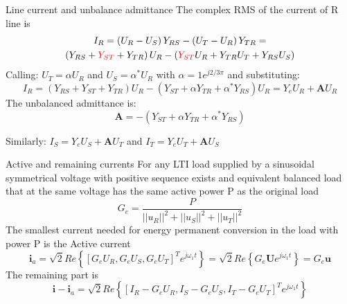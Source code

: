 \documentclass[aspectratio=169]{beamer}
\begin{document}
\begin{frame}{Line current and unbalance admittance}{\insertsection}
    The complex RMS of the current of R line is 
    \begin{gather}
        I_R = \left(U_R-U_S\right)Y_{RS} - \left(U_T-U_R\right)Y_{TR} = \notag \\
        \left(Y_{RS} + \textcolor{red}{Y_{ST}} + Y_{TR}\right) U_R - \left(\textcolor{red}{Y_{ST}}U_R + Y_{TR}U_T + Y_{RS}U_S\right)
    \end{gather}
    Calling: $U_T = \alpha U_R$ and $U_S = \alpha^* U_R$ with $\alpha=1e^{j2/3\pi}$ and substituting:
    \begin{equation}
        I_R = \left(Y_{RS} + Y_{ST} + Y_{TR}\right) U_R - \left(Y_{ST} + \alpha Y_{TR} + \alpha^* Y_{RS}\right)U_R = Y_e U_R + \textbf{A} U_R
        \label{eq:I_R}
    \end{equation}
     The \textcolor{NTNU_orange}{unbalanced admittance} is:
    \begin{equation}
      \textbf{A} =-(Y_{ST} + \alpha Y_{TR} + \alpha^*Y_{RS} )
    \end{equation}

    Similarly: $I_S = Y_e U_S + \textbf{A} U_T$  and  $I_T = Y_e U_T + \textbf{A} U_S$
\end{frame}

\begin{frame}{Active and remaining currents}{\insertsection}
    For any LTI load supplied by a sinusoidal symmetrical voltage with positive sequence exists and equivalent balanced load that at the same voltage has the same active power P as the original load
    \begin{equation}
        G_e = \frac{P}{||u_R||^2 + ||u_S||^2 + ||u_T||^2} 
    \end{equation}
    The smallest current needed for energy permanent conversion in the load with power P is the \textcolor{NTNU_orange}{Active current}
    \begin{equation}
        \textbf{i}_a = \sqrt{2} Re\left\{\left[G_e U_R, G_e U_S, G_e U_T\right]^Te^{j\omega_1t}\right\} = \sqrt{2} Re\left\{G_e \mathbf{U} e^{j\omega_1t} \right\} = G_e \textbf{u}
    \end{equation}
    The remaining part is 
    \begin{equation}
        \textbf{i} - \textbf{i}_a = \sqrt{2} Re\left\{\left[I_R - G_e U_R, I_S -G_e U_S, I_T - G_e U_T\right]^Te^{j\omega_1t}\right\}
        \label{eq:i_minus_ia}
    \end{equation}
    
\end{frame}
\end{document}
